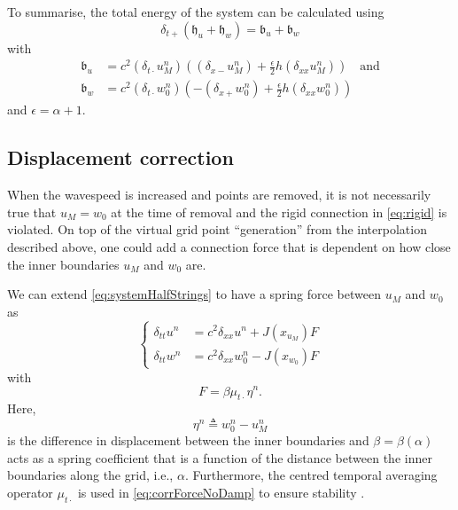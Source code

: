 \documentclass[dvipsnames]{article}
\begin{document}
To summarise, the total energy of the system can be calculated using
\begin{equation}
    \delta_{t+}\left(\mathfrak{h}_u + \mathfrak{h}_w\right) = \mathfrak{b}_u + \mathfrak{b}_w
\end{equation}
with 
\begin{equation}
    \begin{aligned}
    \mathfrak{b}_u &= c^2(\delta_{t\cdot}u_M^n)\left((\delta_{x-}u_M^n)+\frac{\epsilon}{2}h(\delta_{xx}u_M^n)\right) \quad \text{and}\\
    \mathfrak{b}_w &= c^2(\delta_{t\cdot}w_0^n)\left(-(\delta_{x+}w_0^n)+\frac{\epsilon}{2}h(\delta_{xx}w_0^n)\right)
    \end{aligned}
\end{equation}
and $\epsilon = \alpha + 1$.


\subsection{Displacement correction}
When the wavespeed is increased and points are removed, it is not necessarily true that $u_M = w_0$ at the time of removal and the rigid connection in \eqref{eq:rigid} is violated. On top of the virtual grid point ``generation'' from the interpolation described above, one could add a connection force that is dependent on how close the inner boundaries $u_M$ and $w_0$ are.

We can extend \eqref{eq:systemHalfStrings} to have a spring force between $u_M$ and $w_0$ as
\begin{equation}\label{eq:dispCorrSyst}
    \begin{cases}
        \delta_{tt}u^n &= c^2\delta_{xx}u^n + J(x_{u_M})F\\
        \delta_{tt}w^n &= c^2\delta_{xx}w_0^n - J(x_{w_0})F
    \end{cases}
\end{equation}
with 
\begin{equation}\label{eq:corrForceNoDamp}
    F = \beta \mu_{t\cdot}\eta^n.
\end{equation}
Here,
\begin{equation}\label{eq:etaCorrDef}
    \eta^n \triangleq w_0^n - u_M^n
\end{equation}
is the difference in displacement between the inner boundaries
and $\beta = \beta(\alpha)$ 
acts as a spring coefficient that is a function of the distance between the inner boundaries along the grid, i.e., $\alpha$. Furthermore, the centred temporal averaging operator $\mu_{t\cdot}$ is used in \eqref{eq:corrForceNoDamp} to ensure stability \cite{Bilbao2009}.
\end{document}
